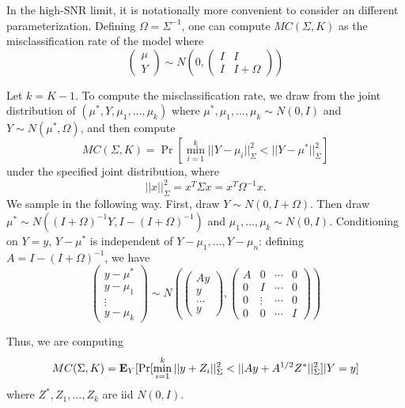 \documentclass[12pt]{article}
\begin{document}
In the high-SNR limit, it is notationally more convenient to consider an different parameterization.
Defining $\Omega=\Sigma^{-1}$, one can compute $MC(\Sigma, K)$ as the misclassification rate
of the model where
\[
\begin{pmatrix}
\mu \\
Y
\end{pmatrix}\sim N\left(0, \begin{pmatrix}
I & I\\
I & I + \Omega
\end{pmatrix}\right)
\]

Let $k = K-1$.  To compute the misclassification rate, we draw from
the joint distribution of $(\mu^*, Y, \mu_1,\hdots, \mu_k)$ where
$\mu^*,\mu_1,\hdots, \mu_k \sim N(0, I)$ and $Y \sim N(\mu^*, \Omega)$,
and then compute
\[
MC(\Sigma, K) = \Pr[\min_{i=1}^k ||Y - \mu_i||^2_\Sigma < ||Y - \mu^*||^2_\Sigma]
\]
under the specified joint distribution, where
\[
||x||_\Sigma^2 = x^T \Sigma x = x^T\Omega^{-1}x.
\]
We sample in the following way.  First, draw $Y \sim N(0, I
+ \Omega)$.  Then draw $\mu^* \sim N((I+\Omega)^{-1}Y,
I-(I+\Omega)^{-1})$ and $\mu_1,\hdots, \mu_k \sim N(0, I)$.
Conditioning on $Y = y$, $Y - \mu^*$ is independent of $Y - \mu_1,\hdots, Y - \mu_n$:
defining $A = I-(I + \Omega)^{-1}$, we have
\[
\begin{pmatrix}
y - \mu^*\\
y - \mu_1\\
\vdots\\
y - \mu_k
\end{pmatrix} \sim N\left(
\begin{pmatrix}
Ay\\
y\\
\hdots\\
y
\end{pmatrix},
\begin{pmatrix}
A & 0 & \cdots &0\\
0 & I & \cdots &0\\
0 & \vdots & \cdots & 0\\
0 & 0 & \cdots &I
\end{pmatrix}
\right)
\]

Thus, we are computing
\[
MC(\Sigma, K) = \textbf{E}_Y[\Pr[\min_{i=1}^k ||y + Z_i||^2_\Sigma < ||Ay + A^{1/2} Z^*||^2_\Sigma]|Y=y]
\]
where $Z^*,Z_1,\hdots, Z_k$ are iid $N(0, I)$.

\end{document}
